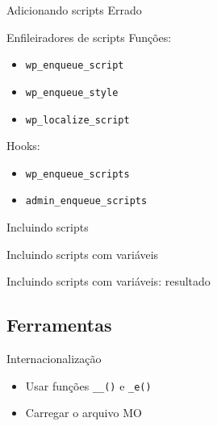 \documentclass{beamer}
\begin{document}
\begin{frame}{Adicionando scripts}
  \pause Errado
  \pause 
\end{frame}

\begin{frame}{Enfileiradores de scripts}
\pause Funções:
\begin{itemize}
  \pause \item \texttt{wp\_enqueue\_script}
  \pause \item \texttt{wp\_enqueue\_style}
  \pause \item \texttt{wp\_localize\_script}
\end{itemize}
\pause Hooks:
\begin{itemize}
  \pause \item \texttt{wp\_enqueue\_scripts}
  \pause \item \texttt{admin\_enqueue\_scripts}
\end{itemize}
\end{frame}

\begin{frame}{Incluindo scripts}
  \pause 
\end{frame}

\begin{frame}{Incluindo scripts com variáveis}
  \pause 
\end{frame}

\begin{frame}{Incluindo scripts com variáveis: resultado}
  
\end{frame}

\subsection{Ferramentas}

\begin{frame}\end{frame}

\begin{frame}{Internacionalização}
\begin{itemize}
  \pause \item Usar funções \texttt{\_\_()} e \texttt{\_e()}
  \pause \item Carregar o arquivo MO
\end{itemize}
\end{frame}
\end{document}

